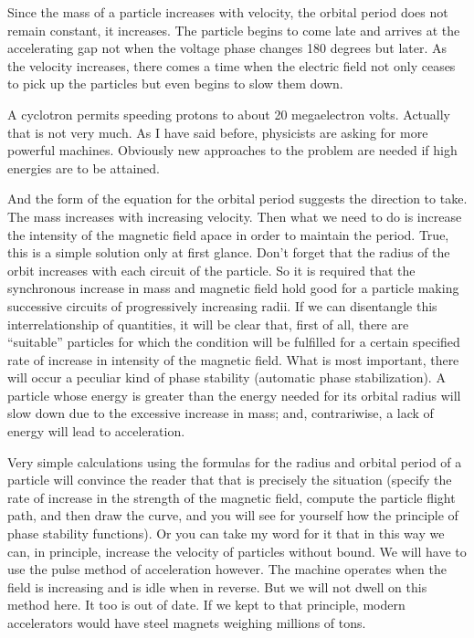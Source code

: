 Since the mass of a particle increases with velocity, the orbital period does not remain constant, it increases. The particle begins to come late and arrives at the accel­erating gap not when the voltage phase changes 180 de­grees but later. As the velocity increases, there comes a time when the electric field not only ceases to pick up the particles but even begins to slow them down.

A cyclotron permits speeding protons to about 20 megaelectron volts. Actually that is not very much. As I have said before, physicists are asking for more powerful machines. Obviously new approaches to the problem are needed if high energies are to be attained.

And the form of the equation for the orbital period suggests the direction to take. The mass increases with increasing velocity. Then what we need to do is increase the intensity of the magnetic field apace in order to main­tain the period. True, this is a simple solution only at first glance. Don't forget that the radius of the orbit increases with each circuit of the particle. So it is required that the synchronous increase in mass and magnetic field hold good for a particle making successive circuits of progressively increasing radii. If we can disentangle this interrelationship of quantities, it will be clear that, first of all, there are “suitable” particles for which the condi­tion will be fulfilled for a certain specified rate of increase in intensity of the magnetic field. What is most impor­tant, there will occur a peculiar kind of phase stability (automatic phase stabilization). A particle whose energy is greater than the energy needed for its orbital radius will slow down due to the excessive increase in mass; and, contrariwise, a lack of energy will lead to accelera­tion.

Very simple calculations using the formulas for the radius and orbital period of a particle will convince the reader that that is precisely the situation (specify the rate of increase in the strength of the magnetic field, compute the particle flight path, and then draw the curve, and you will see for yourself how the principle of phase stability functions). Or you can take my word for it that in this way we can, in principle, increase the velocity of particles without bound. We will have to use the pulse method of acceleration however. The machine operates when the field is increasing and is idle when in reverse. But we will not dwell on this method here. It too is out of date. If we kept to that principle, modern accelerators would have steel magnets weighing millions of tons.

